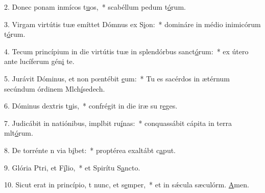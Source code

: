 2. Donec ponam inmícos t\uline{u}os,~* scabéllum pedum t\uline{ó}rum.\par 
3. Virgam virtútis tuæ emíttet Dómnus ex S\uline{i}on:~* domináre in médio inimicórum t\uline{ó}rum.\par 
4. Tecum princípium in die virtútis tuæ in splendórbus sanct\uline{ó}rum:~* ex útero ante lucíferum gén\uline{i} te.\par 
5. Jurávit Dóminus, et non pœntébit \uline{e}um:~* Tu es sacérdos in ætérnum secúndum órdinem Mlch\uline{í}sedech.\par 
6. Dóminus  dextris t\uline{u}is,~* confrégit in die iræ su r\uline{e}ges.\par 
7. Judicábit in natiónibus, implbit ru\uline{í}nas:~* conquassábit cápita in terra mlt\uline{ó}rum.\par 
8. De torrénte n via b\uline{i}bet:~* proptérea exaltábt c\uline{a}put.\par 
9. Glória Ptri, et F\uline{í}lio,~* et Spirítu S\uline{a}ncto.\par 
10. Sicut erat in princípio, t nunc, et s\uline{e}mper,~* et in sǽcula sæculórm. \uline{A}men.\par 
